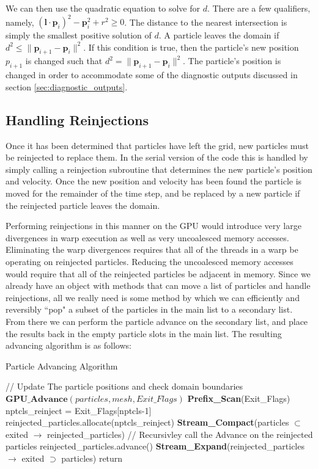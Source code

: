 We can then use the quadratic equation to solve for $d$. There are a few qualifiers, namely, $(\mathbf{l}\cdot \mathbf{p}_i)^2 - \mathbf{p}_i^2 + r^2 \geq 0$. The distance to the nearest intersection is simply the smallest positive solution of $d$. A particle leaves the domain if $d^2 \le \|\mathbf{p}_{i+1} - \mathbf{p}_{i}\|^2$. If this condition is true, then the particle's new position $p_{i+1}$ is changed such that $d^2 = \|\mathbf{p}_{i+1} - \mathbf{p}_{i}\|^2$. The particle's position is changed in order to accommodate some of the diagnostic outputs discussed in section \ref{sec:diagnostic_outputs}. 



		\subsection{Handling Reinjections}
Once it has been determined that particles have left the grid, new particles must be reinjected to replace them. In the serial version of the code this is handled by simply calling a reinjection subroutine that determines the new particle's position and velocity. Once the new position and velocity has been found the particle is moved for the remainder of the time step, and be replaced by a new particle if the reinjected particle leaves the domain.  

Performing reinjections in this manner on the GPU would introduce very large divergences in warp execution as well as very uncoalesced memory accesses. Eliminating the warp divergences requires that all of the threads in a warp be operating on reinjected particles. Reducing the uncoalesced memory accesses would require that all of the reinjected particles be adjacent in memory.  Since we already have an object with methods that can move a list of particles and handle reinjections, all we really need is some method by which we can efficiently and reversibly ``pop" a subset of the particles in the main list to a secondary list. From there we can perform the particle advance on the secondary list, and place the results back in the empty particle slots in the main list. The resulting advancing algorithm is as follows:

\begin{algorithm}
	\caption{Particle Advancing Algorithm}
	\label{alg:advancing}
	\begin{algorithmic}
		\STATE // Update The particle positions and check domain boundaries
		\STATE $\textbf{GPU\_Advance}(particles,mesh,Exit\_Flags)$
		\STATE
		\STATE \textbf{Prefix\_Scan}(Exit\_Flags)
		\STATE
		\STATE nptcls\_reinject = Exit\_Flags[nptcls-1]
		\STATE
			\STATE
			\STATE reinjected\_particles.allocate(nptcls\_reinject)
			\STATE
			\STATE \textbf{Stream\_Compact}(particles $\subset$ exited $\rightarrow$ reinjected\_particles)
			\STATE
			\STATE // Recursivley call the Advance on the reinjected particles
			\STATE reinjected\_particles.advance()
			\STATE
			\STATE \textbf{Stream\_Expand}(reinjected\_particles $\rightarrow$ exited $\supset$ particles)
		\ENDIF
		\STATE
		\STATE return
	\end{algorithmic}
\end{algorithm}

